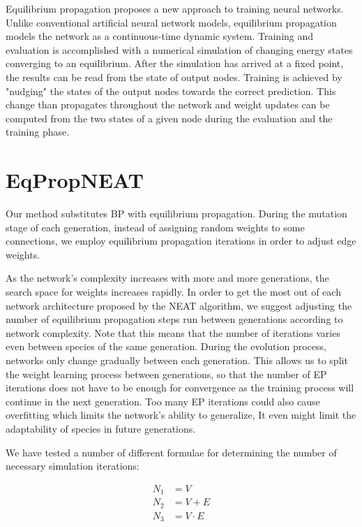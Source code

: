 \documentclass[lettersize,journal]{IEEEtran}
\newcommand{\eqprop}{EP }
\begin{document}
		Equilibrium propagation proposes a new approach to training neural networks. Unlike conventional artificial neural network models, equilibrium propagation models the network as a continuous-time dynamic system. Training and evaluation is accomplished with a numerical simulation of changing energy states converging to an equilibrium. After the simulation has arrived at a fixed point, the results can be read from the state of output nodes. Training is achieved by "nudging" the states of the output nodes towards the correct prediction. This change than propagates throughout the network and weight updates can be computed from the two states of a given node during the evaluation and the training phase.
		
		\section{EqPropNEAT}
		Our method substitutes BP with equilibrium propagation. During the mutation stage of each generation, instead of assigning random weights to some connections, we employ equilibrium propagation iterations in order to adjust edge weights.
		
		As the network's complexity increases with more and more generations, the search space for weights increases rapidly. In order to get the most out of each network architecture proposed by the NEAT algorithm, we suggest adjusting the number of equilibrium propagation steps run between generations according to network complexity. Note that this means that the number of iterations varies even between species of the same generation. During the evolution process, networks only change gradually between each generation. This allows us to split the weight learning process between generations, so that the number of \eqprop iterations does not have to be enough for convergence as the training process will continue in the next generation. Too many \eqprop iterations could also cause overfitting which limits the network's ability to generalize, It even might limit the adaptability of species in future generations. 
		
		We have tested a number of different formulae for determining the number of necessary simulation iterations:
		
		\begin{align}
			N_1 &= V\\
			N_2 &= V+E\\
			N_3 &= V\cdot E
		\end{align}
		
\end{document}

